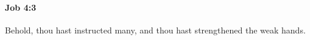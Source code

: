 
		\paragraph{Job 4:3} %
			\label{JOB-4-3}

			Behold, thou hast instructed many, and thou hast strengthened the weak hands.


